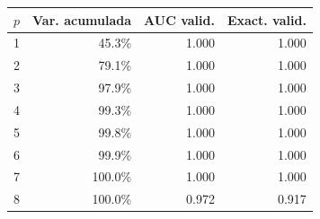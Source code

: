 \footnotesize
\begin{tabular}{crrr}
\toprule
$p$ & Var. acumulada & AUC valid. & Exact. valid. \\
\midrule
1 & 45.3\% & 1.000 & 1.000 \\
2 & 79.1\% & 1.000 & 1.000 \\
3 & 97.9\% & 1.000 & 1.000 \\
4 & 99.3\% & 1.000 & 1.000 \\
5 & 99.8\% & 1.000 & 1.000 \\
6 & 99.9\% & 1.000 & 1.000 \\
7 & 100.0\% & 1.000 & 1.000 \\
8 & 100.0\% & 0.972 & 0.917 \\
\bottomrule
\end{tabular}
